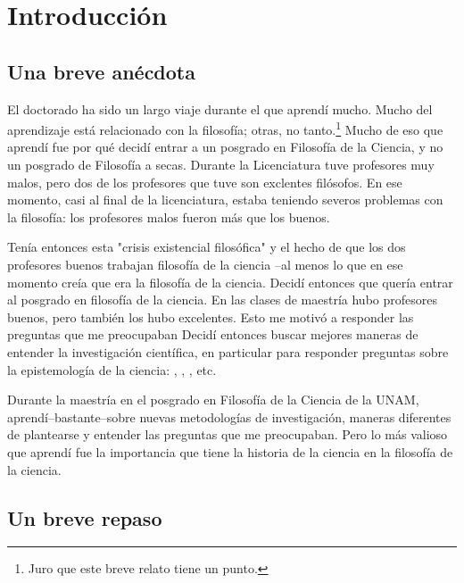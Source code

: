 
\chapter{Introducción}
\label{ch:introduction}


\section{Una breve anécdota}

\noindent El doctorado ha sido un largo viaje durante el que aprendí mucho.
Mucho del aprendizaje está relacionado con la filosofía; otras, no tanto.\footnote{Juro que este breve relato tiene un punto.}
Mucho de eso que aprendí fue por qué decidí entrar a un posgrado en Filosofía de la Ciencia, y no un posgrado de Filosofía a secas.
Durante la Licenciatura tuve profesores muy malos, pero dos de los profesores que tuve son exclentes filósofos.
En ese momento, casi al final de la licenciatura, estaba teniendo severos problemas con la filosofía: los profesores malos fueron más que los buenos.

Tenía entonces esta "crisis existencial filosófica" y el hecho de que los dos profesores buenos trabajan filosofía de la ciencia --al menos lo que en ese momento creía que era la filosofía de la ciencia.
Decidí entonces que quería entrar al posgrado en filosofía de la ciencia.
En las clases de maestría hubo profesores buenos, pero también los hubo excelentes.
Esto me motivó a responder las preguntas que me preocupaban
Decidí entonces buscar mejores maneras de entender la investigación científica, en particular para responder preguntas sobre la epistemología de la ciencia: , , , etc.

Durante la maestría en el posgrado en Filosofía de la Ciencia de la UNAM, aprendí--bastante--sobre nuevas metodologías de investigación, maneras diferentes de plantearse y entender las preguntas que me preocupaban.
Pero lo más valioso que aprendí fue la importancia que tiene la historia de la ciencia en la filosofía de la ciencia.



\section{Un breve repaso}

